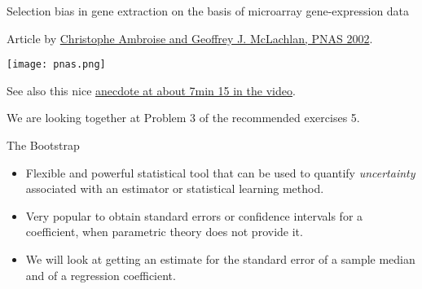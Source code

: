 \documentclass[10pt,ignorenonframetext,]{beamer}
\providecommand{\tightlist}{%
  \setlength{\itemsep}{0pt}\setlength{\parskip}{0pt}}
\begin{document}
\begin{frame}

\begin{block}{Selection bias in gene extraction on the basis of
microarray gene-expression data}

\vspace{2mm}

Article by \href{http://www.pnas.org/content/99/10/6562}{Christophe
Ambroise and Geoffrey J. McLachlan, PNAS 2002}.

\texttt{[image: pnas.png]}

\vspace{10mm}

See also this nice
\href{https://www.youtube.com/watch?v=r64tRyHFAJ8\&list=PLAOUn-KLSAVNz3lv4a957qRpfPWH2EOg4\&index=3}{anecdote
at about 7min 15 in the video}.

\end{block}

\end{frame}

\begin{frame}

We are looking together at Problem 3 of the recommended exercises 5.

\end{frame}

\begin{frame}{The Bootstrap}
\protect\hypertarget{the-bootstrap}{}

\vspace{2mm}

\begin{itemize}
\tightlist
\item
  Flexible and powerful statistical tool that can be used to quantify
  \emph{uncertainty} associated with an estimator or statistical
  learning method.
\end{itemize}

\vspace{2mm}

\begin{itemize}
\tightlist
\item
  Very popular to obtain standard errors or confidence intervals for a
  coefficient, when parametric theory does not provide it.
\end{itemize}

\vspace{2mm}

\begin{itemize}
\tightlist
\item
  We will look at getting an estimate for the standard error of a sample
  median and of a regression coefficient.
\end{itemize}

\end{frame}
\end{document}
